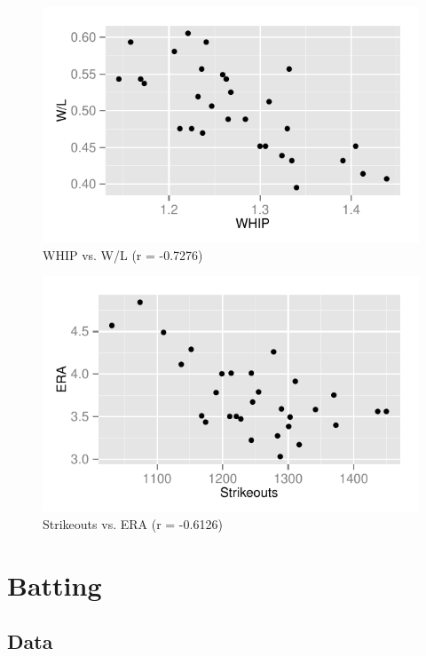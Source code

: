 \documentclass[landscape]{article}
\begin{document}
  \begin{figure}[H]
    \centering
    \includegraphics[scale = 0.9]{figures/mlb/whip_vs_wl.pdf}
    \caption{WHIP vs. W/L (r = -0.7276)}
  \end{figure}
  
  \begin{figure}[H]
    \centering
    \includegraphics[scale = 0.9]{figures/mlb/so_vs_era.pdf}
    \caption{Strikeouts vs. ERA (r = -0.6126)}
  \end{figure}

  \section{Batting} %
  
  \subsection{Data} %
  
\end{document}
